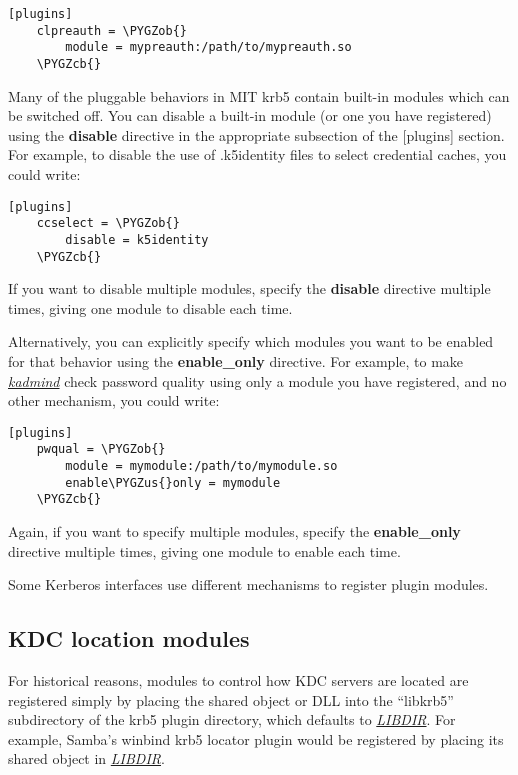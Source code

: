 \documentclass[letterpaper,10pt,english]{sphinxmanual}
\def\PYGZus{\char`\_}
\def\PYGZob{\char`\{}
\def\PYGZcb{\char`\}}
\begin{document}
\begin{Verbatim}[commandchars=\\\{\}]
[plugins]
    clpreauth = \PYGZob{}
        module = mypreauth:/path/to/mypreauth.so
    \PYGZcb{}
\end{Verbatim}

Many of the pluggable behaviors in MIT krb5 contain built-in modules
which can be switched off.  You can disable a built-in module (or one
you have registered) using the \textbf{disable} directive in the
appropriate subsection of the {[}plugins{]} section.  For example, to
disable the use of .k5identity files to select credential caches, you
could write:

\begin{Verbatim}[commandchars=\\\{\}]
[plugins]
    ccselect = \PYGZob{}
        disable = k5identity
    \PYGZcb{}
\end{Verbatim}

If you want to disable multiple modules, specify the \textbf{disable}
directive multiple times, giving one module to disable each time.

Alternatively, you can explicitly specify which modules you want to be
enabled for that behavior using the \textbf{enable\_only} directive.  For
example, to make {\hyperref[admin/admin_commands/kadmind:kadmind-8]{\emph{kadmind}}} check password quality using only a
module you have registered, and no other mechanism, you could write:

\begin{Verbatim}[commandchars=\\\{\}]
[plugins]
    pwqual = \PYGZob{}
        module = mymodule:/path/to/mymodule.so
        enable\PYGZus{}only = mymodule
    \PYGZcb{}
\end{Verbatim}

Again, if you want to specify multiple modules, specify the
\textbf{enable\_only} directive multiple times, giving one module to enable
each time.

Some Kerberos interfaces use different mechanisms to register plugin
modules.


\subsection{KDC location modules}
\label{admin/host_config:kdc-location-modules}
For historical reasons, modules to control how KDC servers are located
are registered simply by placing the shared object or DLL into the
``libkrb5'' subdirectory of the krb5 plugin directory, which defaults to
{\hyperref[mitK5defaults:paths]{\emph{LIBDIR}}}.  For example, Samba's winbind krb5
locator plugin would be registered by placing its shared object in
{\hyperref[mitK5defaults:paths]{\emph{LIBDIR}}}.
\end{document}
